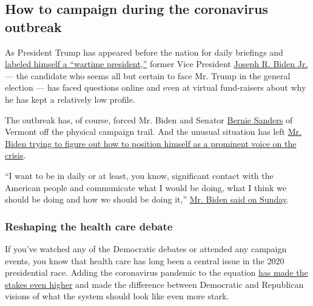 \hypertarget{how-to-campaign-during-the-coronavirus-outbreak}{%
\subsection{How to campaign during the coronavirus
outbreak}\label{how-to-campaign-during-the-coronavirus-outbreak}}

As President Trump has appeared before the nation for daily briefings
and
\href{https://www.nytimes3xbfgragh.onion/2020/03/22/us/politics/coronavirus-trump-wartime-president.html}{labeled
himself a ``wartime president,''} former Vice President
\href{https://www.nytimes3xbfgragh.onion/interactive/2020/us/elections/joe-biden.html}{Joseph
R. Biden Jr.} --- the candidate who seems all but certain to face Mr.
Trump in the general election --- has faced questions online and even at
virtual fund-raisers about why he has kept a relatively low profile.

The outbreak has, of course, forced Mr. Biden and Senator
\href{https://www.nytimes3xbfgragh.onion/interactive/2020/us/elections/bernie-sanders.html}{Bernie
Sanders} of Vermont off the physical campaign trail. And the unusual
situation has left
\href{https://www.nytimes3xbfgragh.onion/2020/03/23/us/politics/joe-biden-2020-virus.html}{Mr.
Biden trying to figure out how to position himself as a prominent voice
on the crisis}.

``I want to be in daily or at least, you know, significant contact with
the American people and communicate what I would be doing, what I think
we should be doing and how we should be doing it,''
\href{https://www.nytimes3xbfgragh.onion/2020/03/22/us/politics/biden-trump-coronavirus.html}{Mr.
Biden said on Sunday}.

\hypertarget{reshaping-the-health-care-debate}{%
\subsubsection{Reshaping the health care
debate}\label{reshaping-the-health-care-debate}}

If you've watched any of the Democratic debates or attended any campaign
events, you know that health care has long been a central issue in the
2020 presidential race. Adding the coronavirus pandemic to the equation
\href{https://www.nytimes3xbfgragh.onion/2020/03/26/us/politics/coronavirus-health-care.html}{has
made the stakes even higher} and made the difference between Democratic
and Republican visions of what the system should look like even more
stark.

